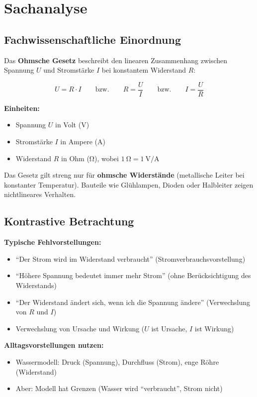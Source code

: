 \documentclass[11pt,a4paper]{article}
\begin{document}
\section{Sachanalyse}

\subsection{Fachwissenschaftliche Einordnung}
Das \textbf{Ohmsche Gesetz} beschreibt den linearen Zusammenhang zwischen Spannung $U$ und Stromstärke $I$ bei konstantem Widerstand $R$:

\[
U = R \cdot I \qquad \text{bzw.} \qquad R = \frac{U}{I} \qquad \text{bzw.} \qquad I = \frac{U}{R}
\]

\textbf{Einheiten:}
\begin{itemize}
    \item Spannung $U$ in Volt (\si{\volt})
    \item Stromstärke $I$ in Ampere (\si{\ampere})
    \item Widerstand $R$ in Ohm (\si{\ohm}), wobei $\SI{1}{\ohm} = \SI{1}{\volt\per\ampere}$
\end{itemize}

Das Gesetz gilt streng nur für \textbf{ohmsche Widerstände} (metallische Leiter bei konstanter Temperatur). Bauteile wie Glühlampen, Dioden oder Halbleiter zeigen nichtlineares Verhalten.

\subsection{Kontrastive Betrachtung}
\textbf{Typische Fehlvorstellungen:}
\begin{itemize}
    \item ``Der Strom wird im Widerstand verbraucht'' (Stromverbrauchsvorstellung)
    \item ``Höhere Spannung bedeutet immer mehr Strom'' (ohne Berücksichtigung des Widerstands)
    \item ``Der Widerstand ändert sich, wenn ich die Spannung ändere'' (Verwechslung von $R$ und $I$)
    \item Verwechslung von Ursache und Wirkung ($U$ ist Ursache, $I$ ist Wirkung)
\end{itemize}

\textbf{Alltagsvorstellungen nutzen:}
\begin{itemize}
    \item Wassermodell: Druck (Spannung), Durchfluss (Strom), enge Röhre (Widerstand)
    \item Aber: Modell hat Grenzen (Wasser wird ``verbraucht'', Strom nicht)
\end{itemize}
\end{document}
